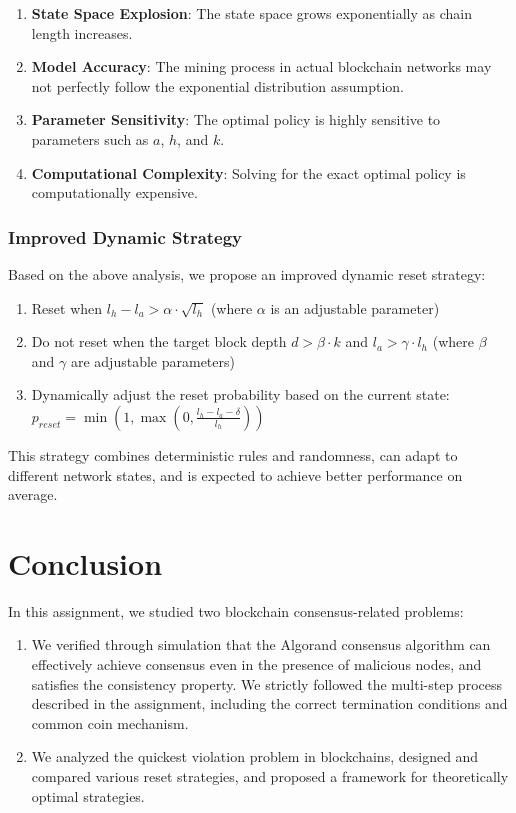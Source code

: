 \documentclass[12pt,a4paper]{article}
\begin{document}
\begin{enumerate}
    \item \textbf{State Space Explosion}: The state space grows exponentially as chain length increases.
    \item \textbf{Model Accuracy}: The mining process in actual blockchain networks may not perfectly follow the exponential distribution assumption.
    \item \textbf{Parameter Sensitivity}: The optimal policy is highly sensitive to parameters such as $a$, $h$, and $k$.
    \item \textbf{Computational Complexity}: Solving for the exact optimal policy is computationally expensive.
\end{enumerate}

\subsubsection{Improved Dynamic Strategy}

Based on the above analysis, we propose an improved dynamic reset strategy:

\begin{enumerate}
    \item Reset when $l_h - l_a > \alpha \cdot \sqrt{l_h}$ (where $\alpha$ is an adjustable parameter)
    \item Do not reset when the target block depth $d > \beta \cdot k$ and $l_a > \gamma \cdot l_h$ (where $\beta$ and $\gamma$ are adjustable parameters)
    \item Dynamically adjust the reset probability based on the current state: $p_{reset} = \min(1, \max(0, \frac{l_h - l_a - \delta}{l_h}))$
\end{enumerate}

This strategy combines deterministic rules and randomness, can adapt to different network states, and is expected to achieve better performance on average.

\section{Conclusion}

In this assignment, we studied two blockchain consensus-related problems:

\begin{enumerate}
    \item We verified through simulation that the Algorand consensus algorithm can effectively achieve consensus even in the presence of malicious nodes, and satisfies the consistency property. We strictly followed the multi-step process described in the assignment, including the correct termination conditions and common coin mechanism.
    \item We analyzed the quickest violation problem in blockchains, designed and compared various reset strategies, and proposed a framework for theoretically optimal strategies.
\end{enumerate}
\end{document}

